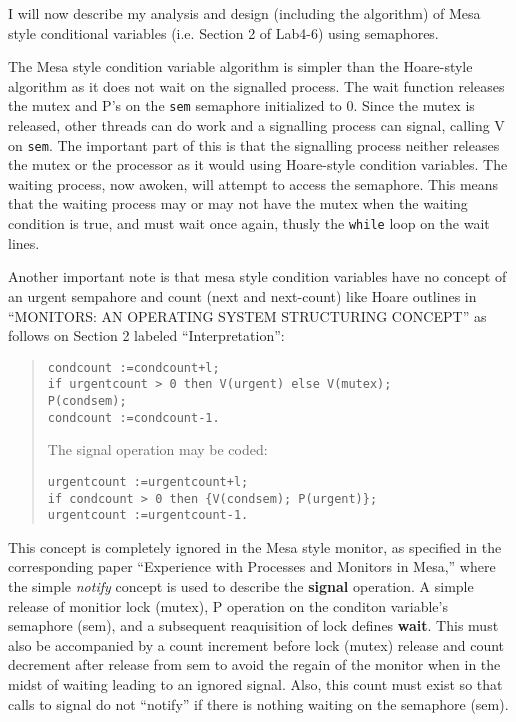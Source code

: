\documentclass[11pt]{article}
\begin{document}
\begin{question}

    I will now describe my analysis and design (including the algorithm) of Mesa style conditional variables (i.e. Section 2 of Lab4-6) using semaphores.

    The Mesa style condition variable algorithm is simpler than the Hoare-style algorithm as it does not wait on the signalled process. The wait function releases the mutex and P's on the {\tt sem} semaphore initialized to 0. Since the mutex is released, other threads can do work and a signalling process can signal, calling V on {\tt sem}. The important part of this is that the signalling process neither releases the mutex or the processor as it would using Hoare-style condition variables. The waiting process, now awoken, will attempt to access the semaphore. This means that the waiting process may or may not have the mutex when the waiting condition is true, and must wait once again, thusly the {\tt while} loop on the wait lines.

    Another important note is that mesa style condition variables have no concept of an urgent sempahore and count (next and next-count) like Hoare outlines in ``MONITORS: AN OPERATING SYSTEM STRUCTURING CONCEPT'' as follows on Section 2 labeled ``Interpretation'':

    \begin{quote}
        \begin{verbatim}
condcount :=condcount+l;
if urgentcount > 0 then V(urgent) else V(mutex);
P(condsem);
condcount :=condcount-1.
        \end{verbatim}
    The signal operation may be coded:
        \begin{verbatim}
urgentcount :=urgentcount+l;
if condcount > 0 then {V(condsem); P(urgent)};
urgentcount :=urgentcount-1.
        \end{verbatim}
    \end{quote}

    This concept is completely ignored in the Mesa style monitor, as specified in the corresponding paper ``Experience with Processes and Monitors in Mesa,'' where the simple {\it notify} concept is used to describe the {\bf signal} operation. A simple release of monitior lock (mutex), P operation on the conditon variable's semaphore (sem), and a subsequent reaquisition of lock defines {\bf wait}. This must also be accompanied by a count increment before lock (mutex) release and count decrement after release from sem to avoid the regain of the monitor when in the midst of waiting leading to an ignored signal. Also, this count must exist so that calls to signal do not ``notify'' if there is nothing waiting on the semaphore (sem).

\end{question}
\end{document}
